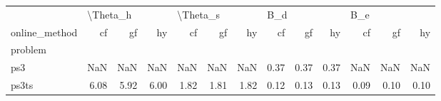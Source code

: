 \begin{tabular}{lrrrrrrrrrrrr}
\toprule
{} & \multicolumn{3}{l}{\textbackslash Theta\_h} & \multicolumn{3}{l}{\textbackslash Theta\_s} & \multicolumn{3}{l}{B\_d} & \multicolumn{3}{l}{B\_e} \\
online\_method &       cf &   gf &   hy &       cf &   gf &   hy &   cf &   gf &   hy &   cf &   gf &   hy \\
problem &          &      &      &          &      &      &      &      &      &      &      &      \\
\midrule
ps3     &      NaN &  NaN &  NaN &      NaN &  NaN &  NaN & 0.37 & 0.37 & 0.37 &  NaN &  NaN &  NaN \\
ps3ts   &     6.08 & 5.92 & 6.00 &     1.82 & 1.81 & 1.82 & 0.12 & 0.13 & 0.13 & 0.09 & 0.10 & 0.10 \\
\bottomrule
\end{tabular}
